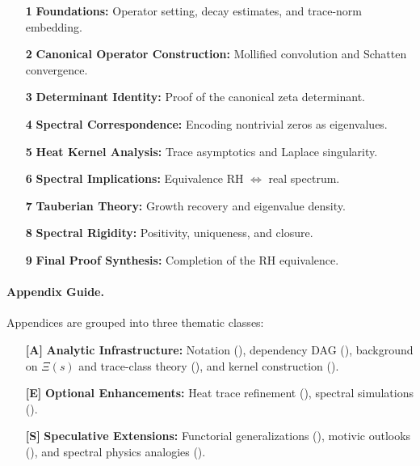 \begin{itemize}
  \item[\textbf{1}] \textbf{Foundations:} Operator setting, decay estimates, and trace-norm embedding.
  \item[\textbf{2}] \textbf{Canonical Operator Construction:} Mollified convolution and Schatten convergence.
  \item[\textbf{3}] \textbf{Determinant Identity:} Proof of the canonical zeta determinant.
  \item[\textbf{4}] \textbf{Spectral Correspondence:} Encoding nontrivial zeros as eigenvalues.
  \item[\textbf{5}] \textbf{Heat Kernel Analysis:} Trace asymptotics and Laplace singularity.
  \item[\textbf{6}] \textbf{Spectral Implications:} Equivalence RH \( \iff \) real spectrum.
  \item[\textbf{7}] \textbf{Tauberian Theory:} Growth recovery and eigenvalue density.
  \item[\textbf{8}] \textbf{Spectral Rigidity:} Positivity, uniqueness, and closure.
  \item[\textbf{9}] \textbf{Final Proof Synthesis:} Completion of the RH equivalence.
\end{itemize}

\paragraph*{Appendix Guide.} Appendices are grouped into three thematic classes:

\begin{itemize}
  \item[\textbf{[A]}] \textbf{Analytic Infrastructure:} Notation (), dependency DAG (), background on \( \Xi(s) \) and trace-class theory (), and kernel construction ().
  
  \item[\textbf{[E]}] \textbf{Optional Enhancements:} Heat trace refinement (), spectral simulations ().

  \item[\textbf{[S]}] \textbf{Speculative Extensions:} Functorial generalizations (), motivic outlooks (), and spectral physics analogies ().
\end{itemize}

